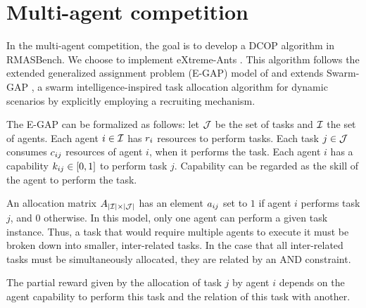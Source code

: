 \section{Multi-agent competition}
\label{sec:multi-agent}

In the multi-agent competition, the goal is to develop a DCOP algorithm in RMASBench. We choose to implement eXtreme-Ants \citep{Santos&Bazzan2009optmas}. This algorithm follows the extended generalized assignment problem (E-GAP) model of \citep{Scerri+2005} and extends Swarm-GAP \citep{Ferreira+2008ccmms}, a swarm intelligence-inspired task allocation algorithm for dynamic scenarios by explicitly employing a recruiting mechanism.

The E-GAP can be formalized as follows: let $\mathcal{J}$ be the set of tasks and $\mathcal{I}$ the set of agents. Each agent $i \in \mathcal{I}$ has $r_{i}$ resources to perform tasks. Each task $j \in \mathcal{J}$ consumes $c_{ij}$ resources of agent $i$, when it performs the task. Each agent $i$ has a capability $k_{ij} \in [0,1]$ to perform task $j$. Capability can be regarded as the skill of the agent to perform the task. %

An allocation matrix $A_{|\mathcal{I}| \times |\mathcal{J}|}$ has an element $a_{ij}$ set to $1$ if agent $i$ performs task $j$, and 0 otherwise. In this model, only one agent can perform a given task instance. Thus, a task that would require multiple agents to execute it must be broken down into smaller, inter-related tasks. In the case that all inter-related tasks must be simultaneously allocated, they are related by an AND constraint. 



The partial reward given by the allocation of task $j$ by agent $i$ depends on the agent capability to perform this task and the relation of this task with another. 


